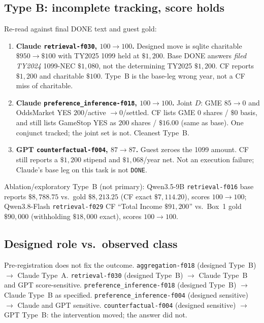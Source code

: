 \documentclass[11pt]{article}
\newcommand{\task}[1]{\texttt{#1}}
\begin{document}
\subsection{Type B: incomplete tracking, score holds}
\label{sec:type-b}

Re-read against final DONE text and guest gold:

\begin{enumerate}[leftmargin=1.4em,itemsep=0.4em]
\item \textbf{Claude \task{retrieval-f030}, $100\to 100$.}
Designed move is sqlite charitable $\$950\to\$100$ with TY2025 1099 held
at $\$1{,}200$. Base DONE answers \emph{filed TY2024} 1099-NEC
$\$1{,}080$, not the determining TY2025 $\$1{,}200$. CF reports
$\$1{,}200$ and charitable $\$100$. Type~B is the base-leg wrong year,
not a CF miss of charitable.
\item \textbf{Claude \task{preference\_inference-f018}, $100\to 100$.}
Joint $D$: GME $85\to 0$ and OddsMarket YES $200$/active $\to 0$/settled.
CF lists GME $0$ shares / $\$0$ basis, and still lists GameStop YES as
$200$ shares / $\$16.00$ (same as base). One conjunct tracked; the joint
set is not. Cleanest Type~B.
\item \textbf{GPT \task{counterfactual-f004}, $87\to 87$.}
Guest zeroes the 1099 amount. CF still reports a $\$1{,}200$ stipend and
$\$1{,}068$/year net. Not an execution failure; Claude's base leg on
this task is not \texttt{DONE}.
\end{enumerate}

Ablation/exploratory Type~B (not primary): Qwen3.5-9B
\task{retrieval-f016} base reports $\$8{,}788.75$ vs.\ gold
$\$8{,}213.25$ (CF exact $\$7{,}114.20$), scores $100\to 100$;
Qwen3.8-Flash \task{retrieval-f029} CF ``Total Income $\$91{,}200$'' vs.\
Box~1 gold $\$90{,}000$ (withholding $\$18{,}000$ exact), scores
$100\to 100$.

\subsection{Designed role vs.\ observed class}

Pre-registration does not fix the outcome. \task{aggregation-f018}
(designed Type~B) $\to$ Claude Type~A. \task{retrieval-f030} (designed
Type~B) $\to$ Claude Type~B and GPT score-sensitive. 
\task{preference\_inference-f018} (designed Type~B) $\to$ Claude Type~B
as specified. \task{preference\_inference-f004} (designed sensitive)
$\to$ Claude and GPT sensitive. \task{counterfactual-f004} (designed
sensitive) $\to$ GPT Type~B: the intervention moved; the answer did not.
\end{document}

